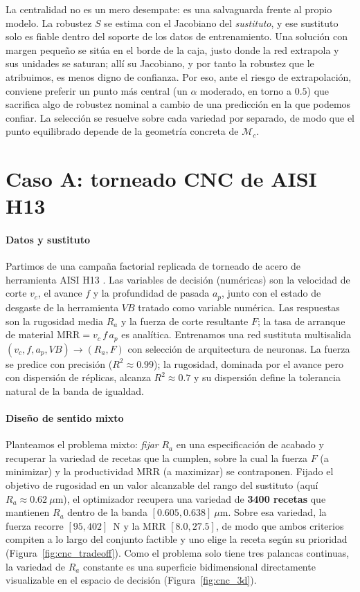 \documentclass[5p,times,authoryear]{elsarticle}
\begin{document}
La centralidad no es un mero desempate: es una salvaguarda frente al propio modelo.
La robustez $S$ se estima con el Jacobiano del \emph{sustituto}, y ese sustituto
solo es fiable dentro del soporte de los datos de entrenamiento. Una solución con
margen pequeño se sitúa en el borde de la caja, justo donde la red extrapola y sus
unidades se saturan; allí su Jacobiano, y por tanto la robustez que le atribuimos,
es menos digno de confianza. Por eso, ante el riesgo de extrapolación, conviene
preferir un punto más central (un $\alpha$ moderado, en torno a $0.5$) que sacrifica
algo de robustez nominal a cambio de una predicción en la que podemos confiar. La
selección se resuelve sobre cada variedad por separado, de modo que el punto
equilibrado depende de la geometría concreta de $\mathcal{M}_c$.

\section{Caso A: torneado CNC de AISI H13}
\label{sec:cnc}

\paragraph{Datos y sustituto} Partimos de una campaña factorial replicada de
torneado de acero de herramienta AISI H13 \citep{canal2022}. Las
variables de decisión (numéricas) son la velocidad de corte $v_c$, el avance $f$
y la profundidad de pasada $a_p$, junto con el estado de desgaste de la
herramienta $VB$ tratado como variable numérica. Las respuestas son la rugosidad
media $R_a$ y la fuerza de corte resultante $F$; la tasa de arranque de material
$\mathrm{MRR}=v_c\,f\,a_p$ es analítica. Entrenamos una red sustituta
multisalida $(v_c,f,a_p,VB)\to(R_a,F)$ con selección de arquitectura de neuronas.
La fuerza se predice con precisión ($R^2\approx0.99$); la rugosidad, dominada por
el avance pero con dispersión de réplicas, alcanza $R^2\approx0.7$ y su
dispersión define la tolerancia natural de la banda de igualdad.

\paragraph{Diseño de sentido mixto} Planteamos el problema mixto: \emph{fijar}
$R_a$ en una especificación de acabado y recuperar la variedad de recetas que la
cumplen, sobre la cual la fuerza $F$ (a minimizar) y la productividad $\mathrm{MRR}$
(a maximizar) se contraponen. Fijado el objetivo de rugosidad en un valor alcanzable del
rango del sustituto (aquí $R_a\approx0.62~\mu$m), el optimizador recupera una variedad de
\textbf{3400 recetas} que mantienen $R_a$ dentro de la banda
$[0.605,0.638]~\mu$m. Sobre esa variedad, la fuerza recorre
$[95,402]$~N y la MRR $[8.0,27.5]$, de modo que ambos criterios compiten a lo largo del
conjunto factible y uno elige la receta según su prioridad
(Figura~\ref{fig:cnc_tradeoff}). Como el problema solo tiene tres palancas
continuas, la variedad de $R_a$ constante es una superficie bidimensional
directamente visualizable en el espacio de decisión
(Figura~\ref{fig:cnc_3d}).
\end{document}
